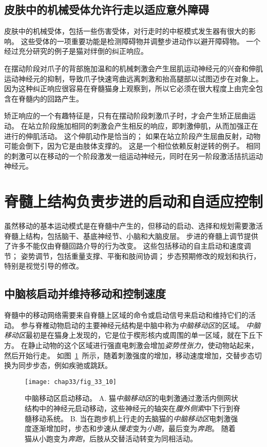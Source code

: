 \subsection{皮肤中的机械受体允许行走以适应意外障碍}

皮肤中的机械受体，包括一些伤害受体，对行走时的中枢模式发生器有很大的影响。
这些受体的一项重要功能是检测障碍物并调整步进动作以避开障碍物。
一个经过充分研究的例子是猫对绊倒的纠正响应。


在摆动阶段对爪子的背部施加温和的机械刺激会产生屈肌运动神经元的兴奋和伸肌运动神经元的抑制，导致爪子快速弯曲远离刺激和抬高腿部以试图迈步在对象上。
因为这种纠正响应很容易在脊髓猫身上观察到，所以它必须在很大程度上由完全包含在脊髓内的回路产生。


矫正响应的一个有趣特征是，只有在摆动阶段刺激爪子时，才会产生矫正屈曲运动。
在站立阶段施加相同的刺激会产生相反的响应，即刺激伸肌，从而加强正在进行的伸肌活动。
这个伸肌动作是恰当的；
如果在站立阶段产生屈曲反射，动物可能会倒下，因为它是由肢体支撑的。
这是一个相位依赖反射逆转的例子。
相同的刺激可以在移动的一个阶段激发一组运动神经元，同时在另一阶段激活拮抗运动神经元。



\section{脊髓上结构负责步进的启动和自适应控制}

虽然移动的基本运动模式是在脊髓中产生的，但移动的启动、选择和规划需要激活脊髓上结构，包括脑干、基底神经节、小脑和大脑皮层。
步进的脊髓上调节提供了许多不能仅由脊髓回路介导的行为改变。
这些包括移动的自主启动和速度调节；
姿势调节，包括重量支撑、平衡和肢间协调；
步态预期修改的规划和执行，特别是视觉引导的修改。



\subsection{中脑核启动并维持移动和控制速度}

脊髓中的移动网络需要来自脊髓上区域的命令或启动信号来启动和维持它们的活动。
参与脊椎动物启动的主要神经元结构是中脑中称为\textit{中脑移动区}的区域。
\textit{中脑移动区}最初是在猫身上发现的，它是位于楔形核内或周围的单一区域，就在下丘下方。
在静止动物的这个区域进行强直电刺激会增加\textit{姿势性张力}，使动物站起来，然后开始行走。
如图~\ref{fig:33_10}~所示，随着刺激强度的增加，移动速度增加，交替步态切换为同步步态，例如疾驰或跳跃。


\begin{figure}[htbp]
	\centering
	\texttt{[image: chap33/fig\_33\_10]}
	\caption{中脑移动区启动移动。
		A. 猫\textit{中脑移动区}的电刺激通过激活内侧网状结构中的神经元启动移动，这些神经元的轴突在\textit{腹外侧索}中下行到脊髓移动系统。
		B. 当在跑步机上行走的去脑猫的\textit{中脑移动区}电刺激强度逐渐增加时，步态和步速从\textit{慢走}变为\textit{小跑}，最后变为\textit{奔跑}。
		随着猫从小跑变为\textit{奔跑}，后肢从交替活动转变为同相活动。}
	\label{fig:33_10}
\end{figure}


